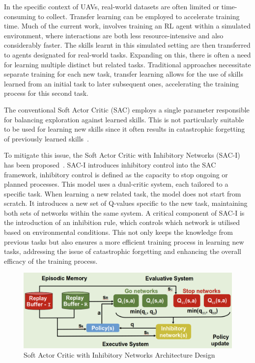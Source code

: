 In the specific context of UAVs, real-world datasets are often limited or time-consuming to collect.
Transfer learning can be employed to accelerate training time.
Much of the current work, involves training an RL agent within a simulated environment, where interactions are both less resource-intensive and also considerably faster. 
The skills learnt in this simulated setting are then transferred to agents designated for real-world tasks.
Expanding on this, there is often a need for learning multiple distinct but related tasks.
Traditional approaches necessitate separate training for each new task, transfer learning allows for the use of skills learned from an initial task to later subsequent ones, accelerating the training process for this second task.

The conventional Soft Actor Critic (SAC) employs a single parameter responsible for balancing exploration against learned skills.
This is not particularly suitable to be used for learning new skills since it often results in catastrophic forgetting of previously learned skills~\cite{fyp10-initial-transfer-learning}.

To mitigate this issue, the Soft Actor Critic with Inhibitory Networks (SAC-I) has been proposed~\cite{fyp10-sac-Inhibitory}.
SAC-I introduces inhibitory control into the SAC framework, inhibitory control is defined as the capacity to stop ongoing or planned processes.
This model uses a dual-critic system, each tailored to a specific task.
When learning a new related task, the model does not start from scratch.
It introduces a new set of Q-values specific to the new task, maintaining both sets of networks within the same system. 
A critical component of SAC-I is the introduction of an inhibition rule, which controls which network is utilised based on environmental conditions.
This not only keeps the knowledge from previous tasks but also ensures a more efficient training process in learning new tasks, addressing the issue of catastrophic forgetting and enhancing the overall efficacy of the training process.

\begin{figure}[htbp]
  \centering
  \includegraphics[width=\textwidth]{background/fyp-10-sac-inhibitors.png}
  \caption{Soft Actor Critic with Inhibitory Networks Architecture Design}
\label{fig:fyp17-sacfd}
\end{figure}

